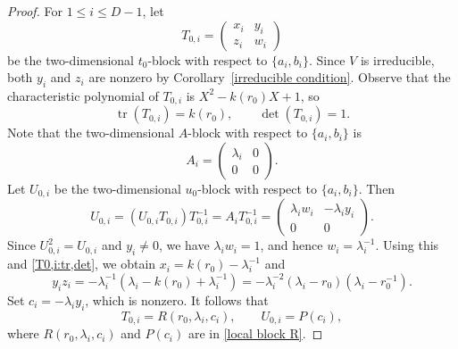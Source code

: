 \documentclass[reqno]{amsart}
\theoremstyle{definition}
\begin{document}
\begin{proof}
For $1\leq i\leq D-1$, let
$$
T_{0,i}=
\begin{pmatrix}
x_i&y_i\\
z_i&w_i
\end{pmatrix}
$$
be the two-dimensional $t_0$-block with respect to
$\{a_i,b_i\}$.
Since $V$ is irreducible, both $y_i$ and $z_i$ are nonzero by
Corollary~\ref{irreducible condition}.
Observe that the characteristic polynomial of $T_{0,i}$ is
$X^2-k(r_0)X+1$, so
\begin{equation}\label{T0,i:tr,det}
\operatorname{tr}(T_{0,i})=k(r_0),
\qquad
\det(T_{0,i})=1.
\end{equation}
Note that the two-dimensional $A$-block with respect to
$\{a_i,b_i\}$ is
$$
A_i=
\begin{pmatrix}
\lambda_i&0\\
0&0
\end{pmatrix}.
$$
Let $U_{0,i}$ be the two-dimensional $u_0$-block with respect to
$\{a_i,b_i\}$.
Then
$$
U_{0,i}
=(U_{0,i}T_{0,i})T_{0,i}^{-1}
=A_iT_{0,i}^{-1}
=
\begin{pmatrix}
\lambda_iw_i&-\lambda_i y_i\\
0&0
\end{pmatrix}.
$$
Since $U_{0,i}^2=U_{0,i}$ and $y_i\neq0$, we have
$\lambda_iw_i=1$, and hence
$w_i=\lambda_i^{-1}$.
Using this and \eqref{T0,i:tr,det}, we obtain $x_i=k(r_0)-\lambda_i^{-1}$
and
\begin{equation}
y_iz_i=-\lambda_i^{-1}
(\lambda_i-k(r_0)+\lambda_i^{-1})
= -\lambda_i^{-2}(\lambda_i-r_0)(\lambda_i-r_0^{-1}).
\label{lambda neq r_0}
\end{equation}
Set $c_i=-\lambda_i y_i$, which is nonzero.
It follows that
$$
T_{0,i}=R(r_0,\lambda_i,c_i),
\qquad
U_{0,i}=P(c_i),
$$
where $R(r_0,\lambda_i,c_i)$ and $P(c_i)$ are in
\eqref{local block R}.


\end{proof}
\end{document}
